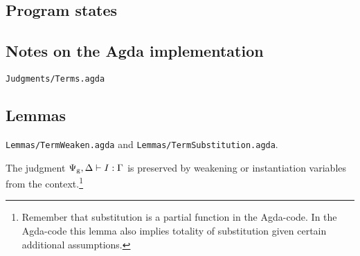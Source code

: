 \begin{mathpar}
\end{mathpar}

\subsection{Program states}

\begin{mathpar}
\end{mathpar}

\begin{mathpar}
\end{mathpar}

\subsection{Notes on the Agda implementation}
\texttt{Judgments/Terms.agda}

\subsection{Lemmas}

\texttt{Lemmas/TermWeaken.agda} and \texttt{Lemmas/TermSubstitution.agda}.

\begin{lemma}
  \label{lemma:instructions-context}
  The judgment $\ofinstructions{\Psi_{\mathrm{g}}, \Delta}{\high I}{\Gamma}$ is
  preserved by weakening or instantiation variables
  from the context.\footnote{Remember that substitution is a partial function in
    the Agda-code. In the Agda-code this lemma also implies totality of
    substitution given certain additional assumptions.}
\end{lemma}

